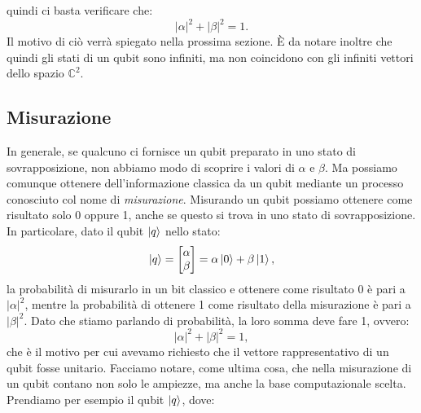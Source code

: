 \documentclass{book}
\theoremstyle{definition}
\theoremstyle{definition}
\theoremstyle{definition}
\theoremstyle{plain}
\theoremstyle{plain}
\theoremstyle{plain}
\theoremstyle{plain}
\begin{document}
quindi ci basta verificare che:
\begin{displaymath}
\left\lvert \alpha \right\rvert^{2} + \left\lvert \beta \right\rvert^{2} = 1 .
\end{displaymath}
Il motivo di ciò verrà spiegato nella prossima sezione. È da notare inoltre che quindi gli stati di un qubit sono infiniti, ma non coincidono con gli infiniti vettori dello spazio $\mathbb{C}^{2}$.

\subsection{Misurazione}
In generale, se qualcuno ci fornisce un qubit preparato in uno stato di sovrapposizione, non abbiamo modo di scoprire i valori di $\alpha$ e $\beta$. %
Ma possiamo comunque ottenere dell'informazione classica da un qubit mediante un processo conosciuto col nome di \emph{misurazione}.
Misurando un qubit possiamo ottenere come risultato solo 0 oppure 1, anche se questo si trova in uno stato di sovrapposizione. In particolare, dato il qubit $\ket{q}$ nello stato:
\begin{displaymath}
\ket{q} = 
\begin{bmatrix}
\alpha\\
\beta
\end{bmatrix}
= \alpha \ket{0} + \beta \ket{1} ,
\end{displaymath}
la probabilità di misurarlo in un bit classico e ottenere come risultato 0 è pari a $\left\lvert \alpha \right\rvert^{2}$, mentre la probabilità di ottenere 1 come risultato della misurazione è pari a $\left\lvert \beta \right\rvert^{2}$. Dato che stiamo parlando di probabilità, la loro somma deve fare 1, ovvero:
\begin{displaymath}
    \left\lvert \alpha \right\rvert^{2} + \left\lvert \beta \right\rvert^{2} = 1,
\end{displaymath}
che è il motivo per cui avevamo richiesto che il vettore rappresentativo di un qubit fosse unitario. Facciamo notare, come ultima cosa, che nella misurazione di un qubit contano non solo le ampiezze, ma anche la base computazionale scelta. Prendiamo per esempio il qubit $\ket{q}$, dove:
\end{document}
